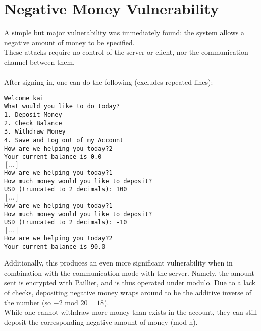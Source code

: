 \documentclass{article}
\newcommand{\codebox}[1]{\begin{tcolorbox}[
    colback=codebackground, boxsep=2pt,
    colframe=white, boxrule=0pt,
    top=0pt, bottom=0pt, left=0pt, right=0pt
]\texttt{#1}
\end{tcolorbox}}
\begin{document}
\section{Negative Money Vulnerability}
A simple but major vulnerability was immediately found: the system allows a negative amount of money to be specified. \\
These attacks require no control of the server or client, nor the communication channel between them. \\
\\
After signing in, one can do the following (excludes repeated lines):
\codebox{Welcome kai \\
    What would you like to do today? \\
    1. Deposit Money \\
    2. Check Balance \\
    3. Withdraw Money \\
    4. Save and Log out of my Account \\
    How are we helping you today?2 \\
    Your current balance is 0.0 \\
    $[\ldots]$ \\
    How are we helping you today?1 \\
    How much money would you like to deposit? \\
    USD (truncated to 2 decimals): 100 \\
    $[\ldots]$ \\
    How are we helping you today?1 \\
    How much money would you like to deposit? \\
    USD (truncated to 2 decimals): -10 \\
    $[\ldots]$ \\
    How are we helping you today?2 \\
    Your current balance is 90.0}
Additionally, this produces an even more significant vulnerability when in combination with
the communication mode with the server. Namely, the amount sent is encrypted with Paillier,
and is thus operated under modulo. Due to a lack of checks, depositing negative money wraps around to be
the additive inverse of the number (so $-2\text{ mod } 20 = 18$). \\
While one cannot withdraw more money than exists in the account,
they can still deposit the corresponding negative amount of money (mod n).
\end{document}
